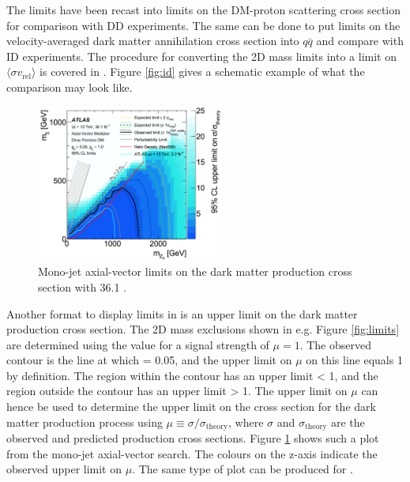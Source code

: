 The \monoZ limits have been recast into limits on the DM-proton scattering cross section for comparison with DD experiments. The same can be done to put limits on the velocity-averaged dark matter annihilation cross section into $q\bar{q}$ and compare with ID experiments. The procedure for converting the 2D mass limits into a limit on $\langle \sigma v_\text{rel} \rangle$ is covered in \cite{Boveia:2016mrp}. Figure \ref{fig:id} gives a schematic example of what the comparison may look like.

\begin{figure}[htb]
\centering
\includegraphics[width=0.55\textwidth]{Figures/limits_dmA_sigma.png}
\caption{Mono-jet axial-vector limits on the dark matter production cross section with 36.1 \ifb \cite{Collaboration:2268179}.}
\label{fig:limits_dmA_sigma_monojet}
\end{figure}

Another format to display limits in is an upper limit on the dark matter production cross section. The 2D mass exclusions shown in e.g. Figure \ref{fig:limits} are determined using the \cls value for a signal strength of $\mu=1$. The observed contour is the line at which \cls = 0.05, and the upper limit on $\mu$ on this line equals 1 by definition. The region within the contour has an upper limit < 1, and the region outside the contour has an upper limit > 1. The upper limit on $\mu$ can hence be used to determine the upper limit on the cross section for the dark matter production process using $\mu \equiv \sigma/\sigma_\text{theory}$, where $\sigma$ and $\sigma_\text{theory}$ are the observed and predicted production cross sections. Figure \ref{fig:limits_dmA_sigma_monojet} shows such a plot from the mono-jet axial-vector search. The colours on the z-axis indicate the observed upper limit on $\mu$. The same type of plot can be produced for \monoZ.

